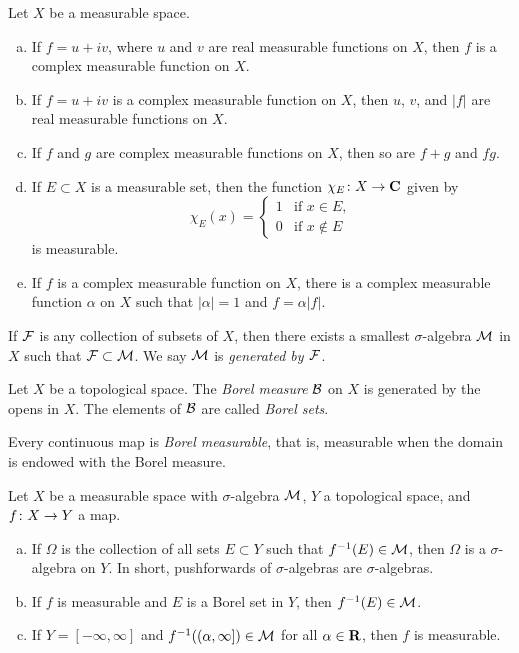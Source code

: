 \begin{corollary}
  Let $X$ be a measurable space.
  \begin{enumerate}[(a)]
  \item If $f = u + i v$, where $u$ and $v$ are real measurable functions on $X$, then $f$ is a complex measurable function on $X$.
  \item If $f = u + i v$ is a complex measurable function on $X$, then $u$, $v$, and $|f|$ are real measurable functions on $X$.
  \item If $f$ and $g$ are complex measurable functions on $X$, then so are $f + g$ and $f g$.
  \item If $E \subset X$ is a measurable set, then the function $\chi_E \colon X \rightarrow \mathbf{C}$ given by
    \[
    \chi_E(x) =
    \begin{cases}
      1 & \textrm{if } x \in E, \\
      0 & \textrm{if } x \notin E
    \end{cases}
    \]
    is measurable.
  \item If $f$ is a complex measurable function on $X$, there is a complex measurable function $\alpha$ on $X$ such that $|\alpha| = 1$ and $f = \alpha |f|$.
  \end{enumerate}
\end{corollary}

\begin{theorem}
  If $\mathcal{F}$ is any collection of subsets of $X$, then there exists a smallest $\sigma$-algebra $\mathcal{M}$ in $X$ such that $\mathcal{F} \subset \mathcal{M}$. We say $\mathcal{M}$ is \emph{generated by $\mathcal{F}$}.
\end{theorem}

\begin{definition}
  Let $X$ be a topological space. The \emph{Borel measure} $\mathcal{B}$ on $X$ is generated by the opens in $X$. The elements of $\mathcal{B}$ are called \emph{Borel sets}.
\end{definition}

\begin{proposition}
  Every continuous map is \emph{Borel measurable}, that is, measurable when the domain is endowed with the Borel measure.
\end{proposition}

\begin{theorem}
  Let $X$ be a measurable space with $\sigma$-algebra $\mathcal{M}$, $Y$ a topological space, and $f \colon X \rightarrow Y$ a map.
  \begin{enumerate}[(a)]
  \item If $\Omega$ is the collection of all sets $E \subset Y$ such that $f^{-1}(E) \in \mathcal{M}$, then $\Omega$ is a $\sigma$-algebra on $Y$. In short, pushforwards of $\sigma$-algebras are $\sigma$-algebras.
  \item If $f$ is measurable and $E$ is a Borel set in $Y$, then $f^{-1}(E) \in \mathcal{M}$.
  \item If $Y = [-\infty,\infty]$ and $f^{-1}((\alpha,\infty]) \in \mathcal{M}$ for all $\alpha \in \mathbf{R}$, then $f$ is measurable.
  \end{enumerate}
\end{theorem}

